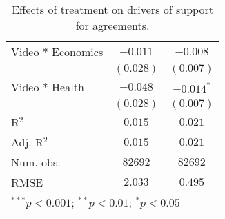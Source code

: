 \begin{table}[h!]
\begin{center}
\begin{tabular}{l c c}
Video * Economics                         & $-0.011$       & $-0.008$       \\
                                          & $(0.028)$      & $(0.007)$      \\
Video * Health                            & $-0.048$       & $-0.014^{*}$   \\
                                          & $(0.028)$      & $(0.007)$      \\
\hline
R$^2$                                     & $0.015$        & $0.021$        \\
Adj. R$^2$                                & $0.015$        & $0.021$        \\
Num. obs.                                 & $82692$        & $82692$        \\
RMSE                                      & $2.033$        & $0.495$        \\
\hline
\multicolumn{3}{l}{\scriptsize{$^{***}p<0.001$; $^{**}p<0.01$; $^{*}p<0.05$}}
\end{tabular}
\caption{Effects of treatment on drivers of support for agreements. }
\label{table:coefficients}
\end{center}
\end{table}

